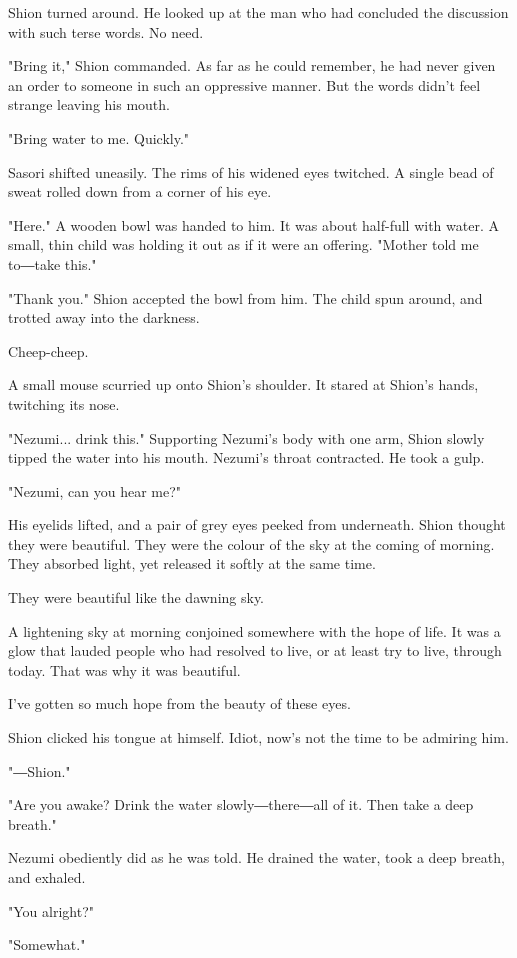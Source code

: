 Shion turned around. He looked up at the man who had concluded the
discussion with such terse words. No need.

"Bring it," Shion commanded. As far as he could remember, he had never
given an order to someone in such an oppressive manner. But the words
didn't feel strange leaving his mouth.

"Bring water to me. Quickly."

Sasori shifted uneasily. The rims of his widened eyes twitched. A single
bead of sweat rolled down from a corner of his eye.

"Here." A wooden bowl was handed to him. It was about half-full with
water. A small, thin child was holding it out as if it were an offering.
"Mother told me to―take this."

"Thank you." Shion accepted the bowl from him. The child spun around,
and trotted away into the darkness.

Cheep-cheep.

A small mouse scurried up onto Shion's shoulder. It stared at Shion's
hands, twitching its nose.

"Nezumi... drink this." Supporting Nezumi's body with one arm, Shion
slowly tipped the water into his mouth. Nezumi's throat contracted. He
took a gulp.

"Nezumi, can you hear me?"

His eyelids lifted, and a pair of grey eyes peeked from underneath.
Shion thought they were beautiful. They were the colour of the sky at
the coming of morning. They absorbed light, yet released it softly at
the same time.

They were beautiful like the dawning sky.

A lightening sky at morning conjoined somewhere with the hope of life.
It was a glow that lauded people who had resolved to live, or at least
try to live, through today. That was why it was beautiful.

I've gotten so much hope from the beauty of these eyes.

Shion clicked his tongue at himself. Idiot, now's not the time to be
admiring him.

"―Shion."

"Are you awake? Drink the water slowly―there―all of it. Then take a deep
breath."

Nezumi obediently did as he was told. He drained the water, took a deep
breath, and exhaled.

"You alright?"

"Somewhat."

